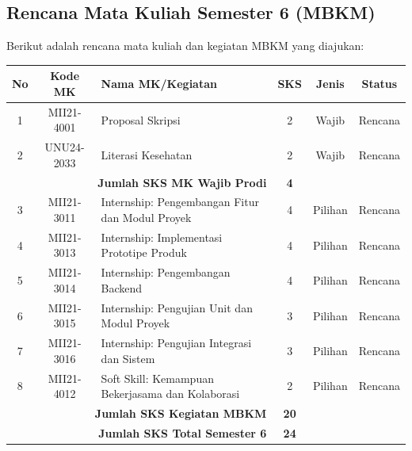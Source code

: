 \subsection{Rencana Mata Kuliah Semester 6 (MBKM)}

Berikut adalah rencana mata kuliah dan kegiatan MBKM yang diajukan:

\begin{table}[H]
    \centering
    \begin{tabular}{|c|c|p{6.5cm}|c|c|c|}
        \hline
        \textbf{No} & \textbf{Kode MK} & \textbf{Nama MK/Kegiatan} & \textbf{SKS} & \textbf{Jenis} & \textbf{Status} \\
        \hline
        1 & MII21-4001 & Proposal Skripsi & 2 & Wajib & Rencana \\
        2 & UNU24-2033 & Literasi Kesehatan & 2 & Wajib & Rencana \\
        \hline
        \multicolumn{3}{|r|}{\textbf{Jumlah SKS MK Wajib Prodi}} & \textbf{4} & & \\
        \hline
        3 & MII21-3011 & Internship: Pengembangan Fitur dan Modul Proyek & 4 & Pilihan & Rencana \\
        4 & MII21-3013 & Internship: Implementasi Prototipe Produk & 4 & Pilihan & Rencana \\
        5 & MII21-3014 & Internship: Pengembangan Backend & 4 & Pilihan & Rencana \\
        6 & MII21-3015 & Internship: Pengujian Unit dan Modul Proyek & 3 & Pilihan & Rencana \\
        7 & MII21-3016 & Internship: Pengujian Integrasi dan Sistem & 3 & Pilihan & Rencana \\
        8 & MII21-4012 & Soft Skill: Kemampuan Bekerjasama dan Kolaborasi & 2 & Pilihan & Rencana \\
        \hline
        \multicolumn{3}{|r|}{\textbf{Jumlah SKS Kegiatan MBKM}} & \textbf{20} & & \\
        \hline
        \multicolumn{3}{|r|}{\textbf{Jumlah SKS Total Semester 6}} & \textbf{24} & & \\
        \hline
    \end{tabular}
\end{table}

\clearpage

